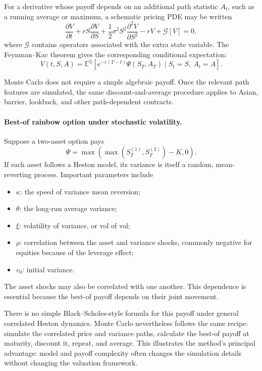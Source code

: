 \documentclass[12pt,openany]{book}
\theoremstyle{definition}
\theoremstyle{remark}
\newcommand{\E}{\mathbb{E}}
\begin{document}
For a derivative whose payoff depends on an additional path statistic
\(A_t\), such as a running average or maximum, a schematic pricing PDE may be
written
\[
\frac{\partial V}{\partial t}
+rS\frac{\partial V}{\partial S}
+\frac12\sigma^2S^2\frac{\partial^2V}{\partial S^2}
-rV+\mathcal{G}[V]=0,
\]
where \(\mathcal{G}\) contains operators associated with the extra state
variable. The Feynman--Kac theorem gives the corresponding conditional
expectation:
\[
V(t,S,A)
=\E^{\mathbb{Q}}\!\left[
e^{-r(T-t)}\Psi(S_T,A_T)
\mid S_t=S,\ A_t=A
\right].
\]

Monte Carlo does not require a simple algebraic payoff. Once the relevant
path features are simulated, the same discount-and-average procedure applies
to Asian, barrier, lookback, and other path-dependent contracts.

\paragraph{Best-of rainbow option under stochastic volatility.}
Suppose a two-asset option pays
\[
\Psi
=\max\!\left(\max(S_T^{(1)},S_T^{(2)})-K,0\right).
\]
If each asset follows a Heston model, its variance is itself a random,
mean-reverting process. Important parameters include
\begin{itemize}
    \item \(\kappa\): the speed of variance mean reversion;
    \item \(\theta\): the long-run average variance;
    \item \(\xi\): volatility of variance, or vol of vol;
    \item \(\rho\): correlation between the asset and variance shocks,
    commonly negative for equities because of the leverage effect;
    \item \(v_0\): initial variance.
\end{itemize}
The asset shocks may also be correlated with one another. This dependence is
essential because the best-of payoff depends on their joint movement.

There is no simple Black--Scholes-style formula for this payoff under general
correlated Heston dynamics. Monte Carlo nevertheless follows the same
recipe: simulate the correlated price and variance paths, calculate the
best-of payoff at maturity, discount it, repeat, and average. This illustrates
the method's principal advantage: model and payoff complexity often changes
the simulation details without changing the valuation framework.
\end{document}
